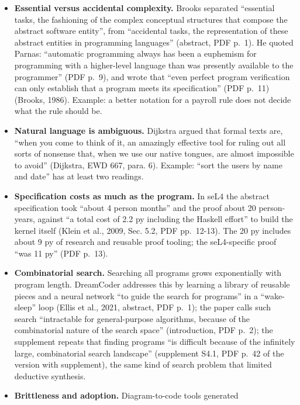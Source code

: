 \documentclass[10pt,letterpaper]{article}
\providecommand{\tightlist}{\setlength{\itemsep}{1pt}\setlength{\parskip}{0pt}}
\begin{document}
\begin{itemize}
\tightlist
\item
  \textbf{Essential versus accidental complexity.} Brooks separated
  ``essential tasks, the fashioning of the complex conceptual structures
  that compose the abstract software entity'', from ``accidental tasks,
  the representation of these abstract entities in programming
  languages'' (abstract, PDF p.~1). He quoted Parnas: ``automatic
  programming always has been a euphemism for programming with a
  higher-level language than was presently available to the programmer''
  (PDF p.~9), and wrote that ``even perfect program verification can
  only establish that a program meets its specification'' (PDF p.~11)
  (Brooks, 1986). Example: a better notation for a payroll rule does not
  decide what the rule should be.
\item
  \textbf{Natural language is ambiguous.} Dijkstra argued that formal
  texts are, ``when you come to think of it, an amazingly effective tool
  for ruling out all sorts of nonsense that, when we use our native
  tongues, are almost impossible to avoid'' (Dijkstra, EWD 667, para.
  6). Example: ``sort the users by name and date'' has at least two
  readings.
\item
  \textbf{Specification costs as much as the program.} In seL4 the
  abstract specification took ``about 4 person months'' and the proof
  about 20 person-years, against ``a total cost of 2.2 py including the
  Haskell effort'' to build the kernel itself (Klein et al., 2009, Sec.
  5.2, PDF pp.~12-13). The 20 py includes about 9 py of research and
  reusable proof tooling; the seL4-specific proof ``was 11 py'' (PDF
  p.~13).
\item
  \textbf{Combinatorial search.} Searching all programs grows
  exponentially with program length. DreamCoder addresses this by
  learning a library of reusable pieces and a neural network ``to guide
  the search for programs'' in a ``wake-sleep'' loop (Ellis et al.,
  2021, abstract, PDF p.~1); the paper calls such search ``intractable
  for general-purpose algorithms, because of the combinatorial nature of
  the search space'' (introduction, PDF p.~2); the supplement repeats
  that finding programs ``is difficult because of the infinitely large,
  combinatorial search landscape'' (supplement S4.1, PDF p.~42 of the
  version with supplement), the same kind of search problem that limited
  deductive synthesis.
\item
  \textbf{Brittleness and adoption.} Diagram-to-code tools generated

\end{itemize}
\end{document}
